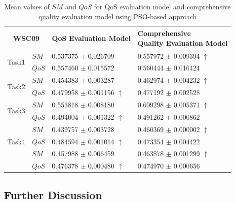 \documentclass{llncs}
\begin{document}
\begin{table}[]
\footnotesize
\centering
\caption{Mean values of $SM$ and $QoS$ for QoS evaluation model and comprehensive quality evaluation model using PSO-based approach}
\label{decisionTable}
\begin{tabular}{l|l|l|l}
\hline
\multicolumn{2}{c|}{WSC09}              & QoS Evaluation Model         &\shortstack{Comprehensive \\ Quality Evaluation Model} \\ \hline
\multirow{2}{*}{Task1}  &$SM$   &0.537375 $\pm$ 0.026709               &0.557972 $\pm$ 0.009394 $\uparrow$ \\ \cline{2-4}
                        &$QoS$  &0.557460 $\pm$ 0.015572               &0.560444 $\pm$ 0.016424                          \\ \hline
\multirow{2}{*}{Task2}  &$SM$   &0.454383 $\pm$ 0.003287               &0.462974 $\pm$ 0.004232 $\uparrow$ \\ \cline{2-4} 
                        &$QoS$  &0.479958 $\pm$ 0.001156 $\uparrow$    &0.477192 $\pm$ 0.002528 \\ \hline
\multirow{2}{*}{Task3}  &$SM$   &0.553818 $\pm$ 0.008180               &0.609298 $\pm$ 0.005371 $\uparrow$   \\ \cline{2-4} 
                        &$QoS$  &0.494004 $\pm$ 0.001322 $\uparrow$    &0.491262 $\pm$ 0.000862            \\ \hline
\multirow{3}{*}{Task4}  &$SM$   &0.439757 $\pm$ 0.003728               &0.460369 $\pm$ 0.000002 $\uparrow$ \\ \cline{2-4} 
                        &$QoS$  &0.484594 $\pm$ 0.001014 $\uparrow$    &0.473354 $\pm$ 0.004422  \\ \hline
\multirow{3}{*}{Task5}  &$SM$   &0.457988 $\pm$ 0.006459               &0.463878 $\pm$ 0.001299 $\uparrow$           \\ \cline{2-4} 
                        &$QoS$  &0.476378 $\pm$ 0.000480 $\uparrow$    &0.474970 $\pm$ 0.000656  \\ \hline                                                   
\end{tabular}
\end{table}

\subsection{Further Discussion}\label{discuss1}
\end{document}

